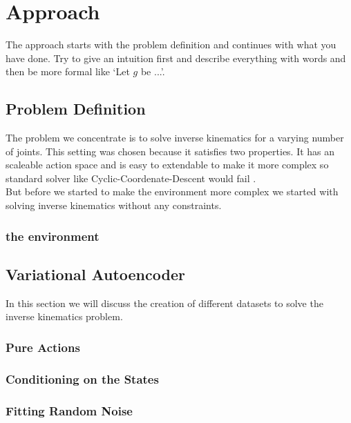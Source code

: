 \chapter{Approach}\label{chap:approach}
The approach starts with the problem definition and continues with what you have done. Try to give an intuition first and describe everything with words and then be more formal like `Let $g$ be ...'.

\section{Problem Definition}
The problem we concentrate is to solve inverse kinematics for a varying number of joints. This setting was chosen because it satisfies two properties. It has an scaleable action space and is easy to extendable to make it more complex so standard solver like Cyclic-Coordenate-Descent would fail . \\
But before we started to make the environment more complex we started with solving inverse kinematics without any constraints.

\subsection{the environment}

\section{Variational Autoencoder}

In this section we will discuss the creation of different datasets to solve the inverse kinematics problem.

\subsection{Pure Actions}

\subsection{Conditioning on the States}
 
\subsection{Fitting Random Noise}

